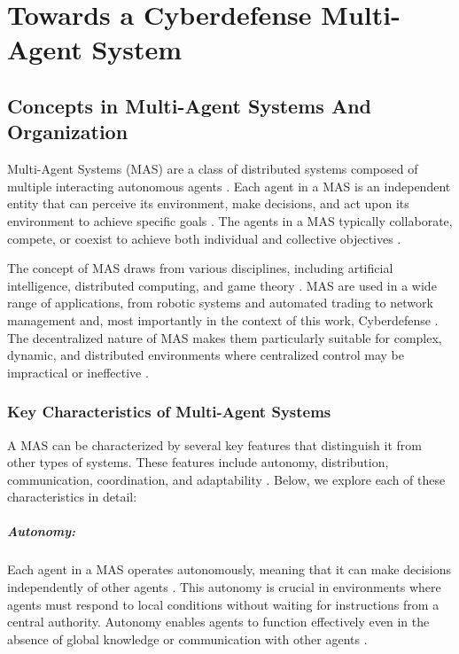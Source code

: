 \chapter{Towards a Cyberdefense Multi-Agent System}\label{ch:towards_cmas}

\section{Concepts in Multi-Agent Systems And Organization}

Multi-Agent Systems (MAS) are a class of distributed systems composed of multiple interacting autonomous agents \cite{wooldridge2009introduction}. Each agent in a MAS is an independent entity that can perceive its environment, make decisions, and act upon its environment to achieve specific goals \cite{ferber1999multi}. The agents in a MAS typically collaborate, compete, or coexist to achieve both individual and collective objectives \cite{weiss1999multiagent}.

The concept of MAS draws from various disciplines, including artificial intelligence, distributed computing, and game theory \cite{shoham2008multiagent}. MAS are used in a wide range of applications, from robotic systems and automated trading to network management and, most importantly in the context of this work, Cyberdefense \cite{jennings1998applications, shakarian2015cyber}. The decentralized nature of MAS makes them particularly suitable for complex, dynamic, and distributed environments where centralized control may be impractical or ineffective \cite{sycara1998multiagent}.

\subsection{Key Characteristics of Multi-Agent Systems}

A MAS can be characterized by several key features that distinguish it from other types of systems. These features include autonomy, distribution, communication, coordination, and adaptability \cite{wooldridge2009introduction}. Below, we explore each of these characteristics in detail:

\paragraph{Autonomy:}
Each agent in a MAS operates autonomously, meaning that it can make decisions independently of other agents \cite{jennings1998applications}. This autonomy is crucial in environments where agents must respond to local conditions without waiting for instructions from a central authority. Autonomy enables agents to function effectively even in the absence of global knowledge or communication with other agents \cite{russell2016artificial}.

